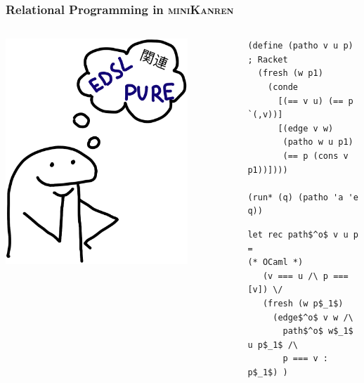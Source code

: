 \documentclass[xcolor={dvipsnames}, aspectratio=169]{beamer}
\newcommand{\mk}{\textsc{miniKanren}\xspace}
\begin{document}
\begin{frame}[fragile]
  \frametitle{Relational Programming in \mk}

  \begin{columns}    
    \begin{column}{0.35\textwidth}
      \centering
      \includegraphics[width=0.8\textwidth]{pic/edsl.jpg}
    \end{column}
    \begin{column}{0.75\textwidth}       
\begin{center}
  \begin{minipage}{0.82\textwidth}
    \begin{lstlisting}[language=racket]
(define (patho v u p)                 ; Racket
  (fresh (w p1)
    (conde
      [(== v u) (== p `(,v))]
      [(edge v w)
       (patho w u p1)
       (== p (cons v p1))])))

(run* (q) (patho 'a 'e q))
    \end{lstlisting}

    \begin{lstlisting}[language=ocanren]
 let rec path$^o$ v u p =                      (* OCaml *)
   (v === u /\ p === [v]) \/
   (fresh (w p$_1$)
     (edge$^o$ v w /\
       path$^o$ w$_1$ u p$_1$ /\
       p === v : p$_1$) )
         \end{lstlisting}
  \end{minipage}
\end{center}

      \end{column}
    \end{columns}
\end{frame}
\end{document}
